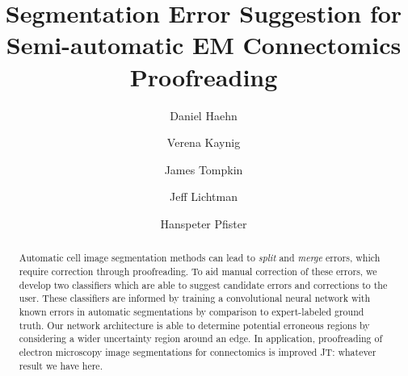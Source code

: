\documentclass{llncs}
\newcommand{\tnote}[3]{{\color{#2}#1: #3}}
\newcommand{\JT}[1]{\tnote{JT}{blue}{#1}}
\begin{document}
%
\title{Segmentation Error Suggestion for Semi-automatic EM Connectomics Proofreading}
%
%
\author{Daniel Haehn \and Verena Kaynig
\and James Tompkin \and Jeff Lichtman \and Hanspeter Pfister}
%
%
%

\maketitle              %

\begin{abstract}
Automatic cell image segmentation methods can lead to \emph{split} and \emph{merge} errors, which require correction through proofreading. To aid manual correction of these errors, we develop two classifiers which are able to suggest candidate errors and corrections to the user. These classifiers are informed by training a convolutional neural network with known errors in automatic segmentations by comparison to expert-labeled ground truth. Our network architecture is able to determine potential erroneous regions by considering a wider uncertainty region around an edge. In application, proofreading of electron microscopy image segmentations for connectomics is improved \JT{whatever result we have here}.
\end{abstract}
%








%
%


\end{document}
